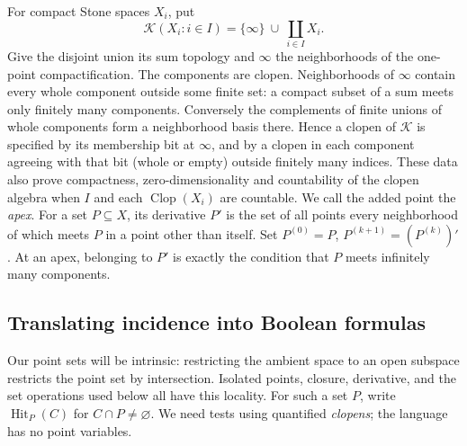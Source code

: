 \documentclass[11pt,letterpaper]{article}
\theoremstyle{definition}\newtheorem{definition}[theorem]{Definition}
\newcommand{\Clop}{\operatorname{Clop}}
\newcommand{\Hit}{\operatorname{Hit}}
\begin{document}
For compact Stone spaces \(X_i\), put
\[
 \mathcal K(X_i:i\in I)=\{\infty\}\ \cup\ \coprod_{i\in I}X_i .
\]
Give the disjoint union its sum topology and \(\infty\) the neighborhoods
of the one-point compactification. The components are clopen. Neighborhoods
of \(\infty\) contain every whole component outside some finite set:
a compact subset of a sum meets only finitely many components. Conversely
the complements of finite unions of whole components form a neighborhood
basis there. Hence a clopen of \(\mathcal K\) is specified by its membership
bit at \(\infty\), and by a clopen in each component agreeing with that
bit (whole or empty) outside finitely many indices. These data also prove
compactness, zero-dimensionality and countability of the clopen algebra
when \(I\) and each \(\Clop(X_i)\) are countable. We call the added point
the \emph{apex}. For a set \(P\subseteq X\), its derivative \(P'\) is
the set of all points every neighborhood of which meets \(P\) in a point
other than itself. Set \(P^{(0)}=P\), \(P^{(k+1)}=(P^{(k)})'\).
At an apex, belonging to \(P'\) is exactly the condition that \(P\)
meets infinitely many components.

\subsection*{Translating incidence into Boolean formulas}
Our point sets will be intrinsic: restricting the ambient space to an open
subspace restricts the point set by intersection. Isolated points, closure,
derivative, and the set operations used below all have this locality.
For such a set \(P\), write \(\Hit_P(C)\) for \(C\cap P\ne\varnothing\).
We need tests using quantified \emph{clopens}; the language has no point
variables.
\end{document}
